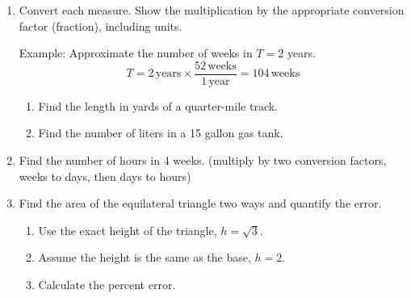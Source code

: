 \begin{enumerate}
\newpage
\item Convert each measure. Show the multiplication by the appropriate conversion factor (fraction), including units. \par \smallskip
  Example: Approximate the number of weeks in $T=2$ years.
  $$T = 2 \,\mathrm{years} \times \displaystyle \frac{52 \,\mathrm{weeks}}{1 \,\mathrm{year}} = 104 \,\mathrm{weeks}$$  \medskip
  \begin{enumerate}[itemsep=2cm]
    \item Find the length in yards of a quarter-mile track.
    \item Find the number of liters in a 15 gallon gas tank.
  \end{enumerate} \vspace{2cm}

\item Find the number of hours in 4 weeks. (multiply by two conversion factors, weeks to days, then days to hours) \vspace{2cm}

\item Find the area of the equilateral triangle two ways and quantify the error.
  \begin{multicols}{2}
  \begin{enumerate}[itemsep=2cm]
    \item Use the exact height of the triangle, $h=\sqrt{3}$.
    \item Assume the height is the same as the base, $h=2$.
    \item Calculate the percent error.
  \end{enumerate}
  \columnbreak
  \begin{flushright}
  \end{flushright}
\end{multicols}
  

\end{enumerate}
